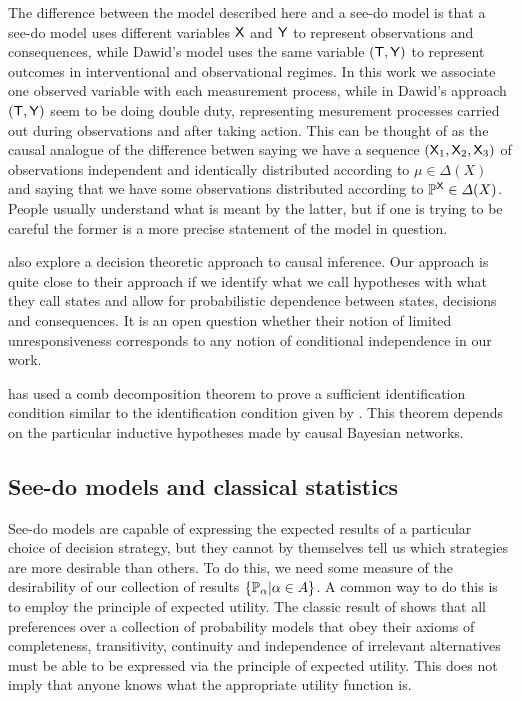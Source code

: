 The difference between the model described here and a see-do model is that a see-do model uses different variables $\mathsf{X}$ and $\mathsf{Y}$ to represent observations and consequences, while Dawid's model uses the same variable $(\mathsf{T},\mathsf{Y})$ to represent outcomes in interventional and observational regimes. In this work we associate one observed variable with each measurement process, while in Dawid's approach $(\mathsf{T},\mathsf{Y})$ seem to be doing double duty, representing mesurement processes carried out during observations and after taking action. This can be thought of as the causal analogue of the difference betwen saying we have a sequence $(\mathsf{X}_1,\mathsf{X}_2,\mathsf{X}_3)$ of observations independent and identically distributed according to $\mu\in \Delta(X)$ and saying that we have some observations distributed according to $\mathbb{P}^{\mathsf{X}}\in \Delta(X)$. People usually understand what is meant by the latter, but if one is trying to be careful the former is a more precise statement of the model in question.

\citet{heckerman_decision-theoretic_1995} also explore a decision theoretic approach to causal inference. Our approach is quite close to their approach if we identify what we call hypotheses with what they call states and allow for probabilistic dependence between states, decisions and consequences. It is an open question whether their notion of limited unresponsiveness corresponds to any notion of conditional independence in our work.

\citet{jacobs_causal_2019} has used a comb decomposition theorem to prove a sufficient identification condition similar to the identification condition given by \citet{tian2002general}. This theorem depends on the particular inductive hypotheses made by causal Bayesian networks.

\subsection{See-do models and classical statistics}

See-do models are capable of expressing the expected results of a particular choice of decision strategy, but they cannot by themselves tell us which strategies are more desirable than others. To do this, we need some measure of the desirability of our collection of results $\{\mathbb{P}_\alpha|\alpha\in A\}$. A common way to do this is to employ the principle of expected utility. The classic result of \citet{von_neumann_theory_1944} shows that all preferences over a collection of probability models that obey their axioms of completeness, transitivity, continuity and independence of irrelevant alternatives must be able to be expressed via the principle of expected utility. This does not imply that anyone knows what the appropriate utility function is.

